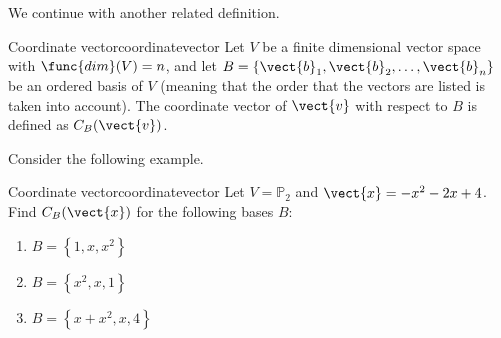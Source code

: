 We continue with another related definition.

\begin{definition}{Coordinate vector}{coordinatevector}
Let $V$ be a finite dimensional vector space with $\func{dim}(V)=n$, and
let $B=\{\vect{b}_1, \vect{b}_2, \ldots, \vect{b}_n\}$ be an ordered basis of $V$ (meaning that the order that the
vectors are listed is taken into account).
The coordinate vector of $\vect{v}$ with respect to $B$ is defined
as $C_B(\vect{v})$.
\end{definition}

Consider the following example.

\begin{example}{Coordinate vector}{coordinatevector}
Let $V = \mathbb{P}_2$ and $\vect{x} = -x^2 -2x + 4$. 
Find $C_B(\vect{x})$ for the following bases $B$:
\begin{enumerate}
\item $B = \left\{ 1, x, x^2 \right\}$
\item $B = \left\{ x^2, x, 1 \right\}$
\item $B = \left\{ x + x^2 , x , 4 \right\}$
\end{enumerate}
\end{example}

